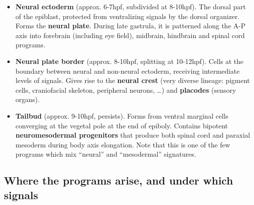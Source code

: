 \documentclass[11pt,a4paper]{article}
\begin{document}
\begin{itemize}
	\item \textbf{Neural ectoderm} (approx. 6-7hpf, subdivided at 8-10hpf). The dorsal part of the epiblast, protected from ventralizing signals by the dorsal organizer. Forms the \textbf{neural plate}. During late gastrula, it is patterned along the A-P axis into forebrain (including eye field), midbrain, hindbrain and spinal cord programs.
	\item \textbf{Neural plate border} (approx. 8-10hpf, splitting at 10-12hpf). Cells at the boundary between neural and non-neural ectoderm, receiving intermediate levels of signals. Gives rise to the \textbf{neural crest} (very diverse lineage: pigment cells, craniofacial skeleton, peripheral neurons, \dots) and \textbf{placodes} (sensory organs).
	\item \textbf{Tailbud} (approx. 9-10hpf, persists). Forms from ventral marginal cells converging at the vegetal pole at the end of epiboly. Contains bipotent \textbf{neuromesodermal progenitors} that produce both spinal cord and paraxial mesoderm during body axis elongation. Note that this is one of the few programs which mix ``neural'' and ``mesodermal'' signatures.
\end{itemize}

\subsection{Where the programs arise, and under which signals}
\label{sec:expected-signals}
\end{document}
